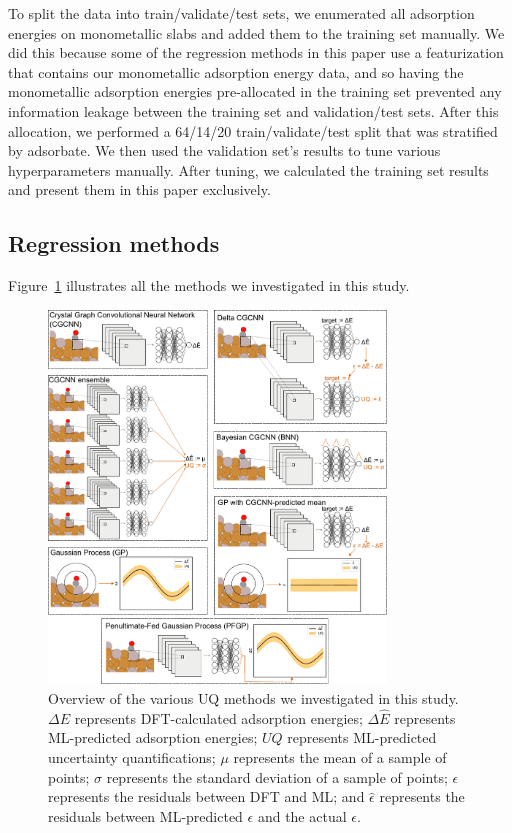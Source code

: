 \documentclass[]{achemso}
\begin{document}
To split the data into train/validate/test sets, we enumerated all adsorption energies on monometallic slabs and added them to the training set manually. 
We did this because some of the regression methods in this paper use a featurization that contains our monometallic adsorption energy data\cite{Tran2018}, and so having the monometallic adsorption energies pre-allocated in the training set prevented any information leakage between the training set and validation/test sets.
After this allocation, we performed a 64/14/20 train/validate/test split that was stratified\cite{Thompson2012} by adsorbate.
We then used the validation set's results to tune various hyperparameters manually.
After tuning, we calculated the training set results and present them in this paper exclusively.

\subsection{Regression methods}

Figure~\ref{fig:methods} illustrates all the methods we investigated in this study.

\begin{figure}
    \centering
    \includegraphics[width=0.8\textwidth]{methods.pdf}
    \caption{Overview of the various \gls{UQ} methods we investigated in this study.
        $\Delta E$ represents \gls{DFT}-calculated adsorption energies;
        $\Delta \hat{E}$ represents \gls{ML}-predicted adsorption energies;
        $UQ$ represents \gls{ML}-predicted uncertainty quantifications;
        $\mu$ represents the mean of a sample of points;
        $\sigma$ represents the standard deviation of a sample of points;
        $\epsilon$ represents the residuals between \gls{DFT} and \gls{ML};
        and $\hat{\epsilon}$ represents the residuals between \gls{ML}-predicted $\epsilon$ and the actual $\epsilon$.
    }\label{fig:methods}
\end{figure}
\end{document}
